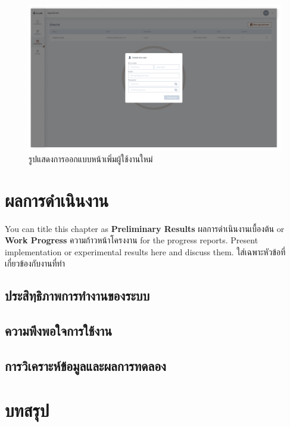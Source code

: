 \documentclass[12pt,oneside,openright,a4paper]{cpe-thai-project}
\begin{document}
\begin{figure}[!h]\centering
  \includegraphics[width=16cm]{./assets/userinterface/setting-create-user.png}
  \caption{รูปแสดงการออกแบบหน้าเพิ่มผู้ใช้งานใหม่}\label{fig:setting-create-user}
\end{figure}


\chapter{ผลการดำเนินงาน}

You can title this chapter as \textbf{Preliminary Results} ผลการดำเนินงานเบื้องต้น or \textbf{Work Progress} ความก้าวหน้าโครงงาน for the progress reports. Present implementation or experimental results here and discuss them.
ใส่เฉพาะหัวข้อที่เกี่ยวข้องกับงานที่ทำ 

\section{ประสิทฺธิภาพการทำงานของระบบ} 
\section{ความพึงพอใจการใช้งาน}
\section{การวิเคราะห์ข้อมูลและผลการทดลอง}

\chapter{บทสรุป}
\end{document}
